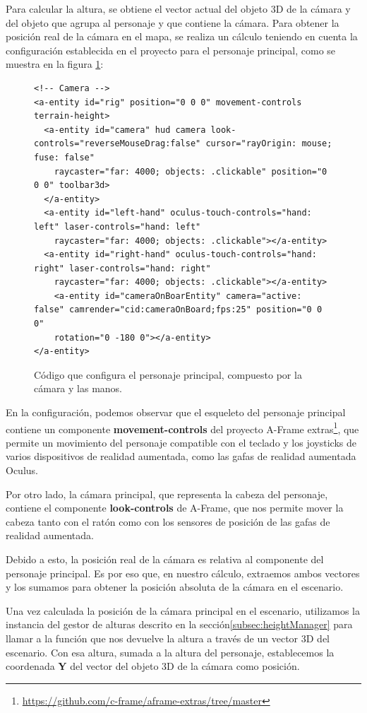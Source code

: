 \documentclass[a4paper, 11pt]{book}
\begin{document}
Para calcular la altura, se obtiene el vector actual del objeto 3D de la cámara y del objeto que agrupa al personaje y que contiene la cámara. Para obtener la posición real de la cámara en el mapa, se realiza un cálculo teniendo en cuenta la configuración establecida en el proyecto para el personaje principal, como se muestra en la figura \ref{codigo:rig}:
\begin{figure}[H]
\centering
\begin{verbatim}
<!-- Camera -->
<a-entity id="rig" position="0 0 0" movement-controls terrain-height>
  <a-entity id="camera" hud camera look-controls="reverseMouseDrag:false" cursor="rayOrigin: mouse; fuse: false"
    raycaster="far: 4000; objects: .clickable" position="0 0 0" toolbar3d>
  </a-entity>
  <a-entity id="left-hand" oculus-touch-controls="hand: left" laser-controls="hand: left"
    raycaster="far: 4000; objects: .clickable"></a-entity>
  <a-entity id="right-hand" oculus-touch-controls="hand: right" laser-controls="hand: right"
    raycaster="far: 4000; objects: .clickable"></a-entity>
    <a-entity id="cameraOnBoarEntity" camera="active: false" camrender="cid:cameraOnBoard;fps:25" position="0 0 0"
    rotation="0 -180 0"></a-entity>
</a-entity>
\end{verbatim}
\caption{Código que configura el personaje principal, compuesto por la cámara y las manos.
\label{codigo:rig}
}
\end{figure}
En la configuración, podemos observar que el esqueleto del personaje principal contiene un componente \textbf{movement-controls} del proyecto A-Frame extras\footnote{\url{https://github.com/c-frame/aframe-extras/tree/master}}, que permite un movimiento del personaje compatible con el teclado y los joysticks de varios dispositivos de realidad aumentada, como las gafas de realidad aumentada Oculus.

Por otro lado, la cámara principal, que representa la cabeza del personaje, contiene el componente \textbf{look-controls} de A-Frame, que nos permite mover la cabeza tanto con el ratón como con los sensores de posición de las gafas de realidad aumentada.

Debido a esto, la posición real de la cámara es relativa al componente del personaje principal. Es por eso que, en nuestro cálculo, extraemos ambos vectores y los sumamos para obtener la posición absoluta de la cámara en el escenario.

Una vez calculada la posición de la cámara principal en el escenario, utilizamos la instancia del gestor de alturas descrito en la sección\ref{subsec:heightManager} para llamar a la función que nos devuelve la altura a través de un vector 3D del escenario. Con esa altura, sumada a la altura del personaje, establecemos la coordenada \textbf{Y} del vector del objeto 3D de la cámara como posición.
\end{document}

